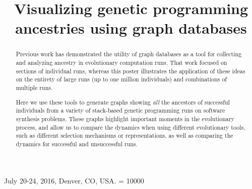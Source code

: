 \documentclass{sig-alternate}
\begin{document}
 {July 20-24, 2016, Denver, CO, USA.}
\widowpenalty = 10000
    
\title{Visualizing genetic programming ancestries using graph databases}

%
\maketitle

\begin{abstract}


Previous work has demonstrated the utility of graph databases as a tool for collecting and analyzing ancestry in evolutionary computation runs. That work focused on sections of individual runs, whereas this poster illustrates the application of these ideas on the entirety of large runs (up to one million individuals) and combinations of multiple runs.

Here we use these tools to generate graphs showing \emph{all} the ancestors of successful individuals from a variety of stack-based genetic programming runs on software synthesis problems. These graphs highlight important moments in the evolutionary process, and allow us to compare the dynamics when using different evolutionary tools, such as different selection mechanisms or representations, as well as comparing the dynamics for successful and unsuccessful runs.

\end{abstract}
\end{document}
